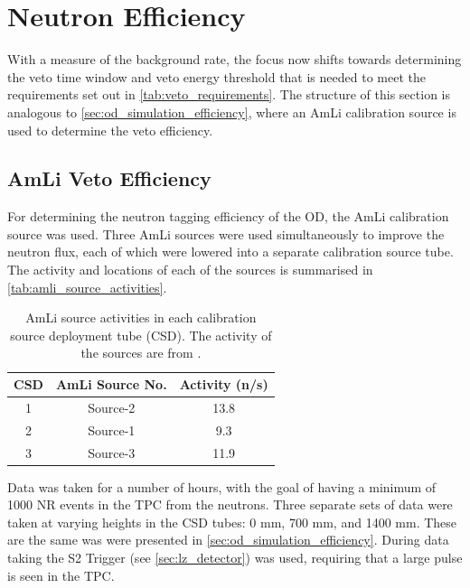 \section{Neutron Efficiency}
\par
With a measure of the background rate, the focus now shifts towards determining the veto time window and veto energy threshold that is needed to meet the requirements set out in \autoref{tab:veto_requirements}.
The structure of this section is analogous to \autoref{sec:od_simulation_efficiency}, where an AmLi calibration source is used to determine the veto efficiency.

\subsection{AmLi Veto Efficiency}
\par
For determining the neutron tagging efficiency of the OD, the AmLi calibration source was used.
Three AmLi sources were used simultaneously to improve the neutron flux, each of which were lowered into a separate calibration source tube.
The activity and locations of each of the sources is summarised in \autoref{tab:amli_source_activities}.

\begin{table}[!htbp]
    \centering
    \begin{tabular}{c|c|c}
        CSD & AmLi Source No. & Activity (n/s) \\ \hline
        1   & Source-2        & 13.8           \\
        2   & Source-1        & 9.3            \\ 
        3   & Source-3        & 11.9                
    \end{tabular}
    \caption{AmLi source activities in each calibration source deployment tube (CSD).
             The activity of the sources are from \cite{LZ_TechnicalDesignReview_ref}.}
    \label{tab:amli_source_activities}
\end{table}

\par
Data was taken for a number of hours, with the goal of having a minimum of 1000 NR events in the TPC from the neutrons.
Three separate sets of data were taken at varying heights in the CSD tubes: 0 mm, 700 mm, and 1400 mm.
These are the same was were presented in \autoref{sec:od_simulation_efficiency}.
During data taking the S2 Trigger (see \autoref{sec:lz_detector}) was used, requiring that a large pulse is seen in the TPC.

